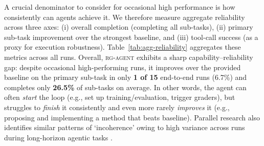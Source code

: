 \documentclass[11pt]{article}
\let\cite\citep
\newcommand{\gtick}{\textcolor{green!60!black}{\ding{51}}}
\newcommand{\rcross}{\textcolor{red!70!black}{\ding{55}}}
\newcommand{\msb}[2]{\ensuremath{#1_\text{{{±#2}}}}}
\newcommand{\kw}[1]{{\textsc{\MakeLowercase{#1}}}}
\theoremstyle{plain}
\theoremstyle{definition}
\theoremstyle{remark}
\begin{document}
A crucial denominator to consider for occasional high performance is how consistently can agents achieve it. We therefore measure aggregate reliability across three axes: (i) overall completion (completing all sub-tasks), (ii) primary sub-task improvement over the strongest baseline, and (iii) tool-call success (as a proxy for execution robustness).
Table~\ref{tab:agg-reliability} aggregates these metrics across all runs. Overall, \kw{RG-Agent} exhibits a sharp capability–reliability gap: despite occasional high-performing runs, it improves over the provided baseline on the primary sub-task in only \textbf{1 of 15} end-to-end runs (6.7\%) and completes only \textbf{26.5\%} of sub-tasks on average. In other words, the agent can often \emph{start} the loop (e.g., set up training/evaluation, trigger graders), but struggles to \emph{finish} it consistently and even more rarely \emph{improves} it (e.g., proposing and implementing a method that beats baseline). Parallel research also identifies similar patterns of `incoherence' owing to high variance across runs during long-horizon agentic tasks \cite{hägele2026hotmessaidoes}.

\end{document}
